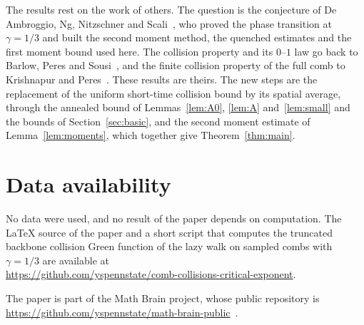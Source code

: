\documentclass[11pt]{amsart}
\theoremstyle{remark}
\numberwithin{equation}{section}
\begin{document}
The results rest on the work of others. The question is the conjecture of De Ambroggio, Ng, Nitzschner and Scali~\cite{DNNS}, who proved the phase transition at $\gamma=1/3$ and built the second moment method, the quenched estimates and the first moment bound used here. The collision property and its $0$--$1$ law go back to Barlow, Peres and Sousi~\cite{BPS}, and the finite collision property of the full comb to Krishnapur and Peres~\cite{KP}. These results are theirs. The new steps are the replacement of the uniform short-time collision bound by its spatial average, through the annealed bound of Lemmas~\ref{lem:A0}, \ref{lem:A} and~\ref{lem:small} and the bounds of Section~\ref{sec:basic}, and the second moment estimate of Lemma~\ref{lem:moments}, which together give Theorem~\ref{thm:main}.

\section*{Data availability}
No data were used, and no result of the paper depends on computation. The \LaTeX{} source of the paper and a short script that computes the truncated backbone collision Green function of the lazy walk on sampled combs with $\gamma=1/3$ are available at\\ \url{https://github.com/yspennstate/comb-collisions-critical-exponent}.

The paper is part of the Math Brain project, whose public repository is \url{https://github.com/yspennstate/math-brain-public}~\cite{MathBrainRepo}.
\end{document}
